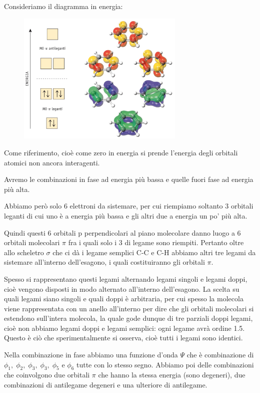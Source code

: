 Consideriamo il diagramma in energia:

\begin{figure}[htp]
    \centering
    \includegraphics[width=8cm]{immagini/orbitali_molecolari_benzene.png}
\end{figure}

Come riferimento, cioè come zero in energia si prende l'energia degli orbitali atomici non ancora interagenti.

Avremo le combinazioni in fase ad energia più bassa e quelle fuori fase ad energia più alta.
        
Abbiamo però solo 6 elettroni da sistemare, per cui riempiamo soltanto 3 orbitali leganti di cui uno è a energia più bassa e gli altri due a energia un po' più alta. 
    
Quindi questi 6 orbitali p perpendicolari al piano molecolare danno luogo a 6 orbitali molecolari $\pi$ fra i quali solo i 3 di legame sono riempiti. Pertanto oltre allo scheletro $\sigma$ che ci dà i legame semplici C-C e C-H abbiamo altri tre legami da sistemare all'interno dell'esagono, i quali costituiranno gli orbitali $\pi$.
    
Spesso si rappresentano questi legami alternando legami singoli e legami doppi, cioè vengono disposti in modo alternato all'interno dell'esagono. La scelta su quali legami siano singoli e quali doppi è arbitraria, per cui spesso la molecola viene rappresentata con un anello all'interno per dire che gli orbitali molecolari si estendono sull'intera molecola, la quale gode dunque di tre parziali doppi legami, cioè non abbiamo legami doppi e legami semplici: ogni legame avrà ordine 1.5. Questo è ciò che sperimentalmente si osserva, cioè tutti i legami sono identici.

Nella combinazione in fase abbiamo una funzione d'onda $\Psi$ che è combinazione di  $\phi_1 , \; \phi_2 , \; \phi_3 , \; \phi_3 , \; \phi_5$ e $\phi_6$ tutte con lo stesso segno. Abbiamo poi delle combinazioni che coinvolgono due orbitali $\pi$ che hanno la stessa energia (sono degeneri), due combinazioni di antilegame degeneri e una ulteriore di antilegame.

